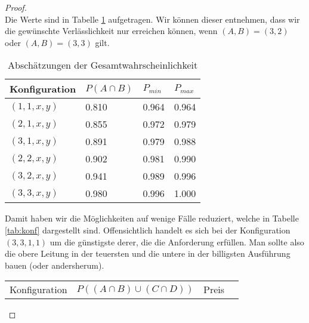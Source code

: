 \documentclass[a4paper]{scrartcl}
\begin{document}
\begin{enumerate}[label=\bfseries\arabic*.]
\begin{proof}
\begin{equation*}
                    \end{equation*}
                    Die Werte sind in Tabelle \ref{tab:absch} aufgetragen.
                    Wir können dieser entnehmen, dass wir die gewünschte
                    Verlässlichkeit nur erreichen können, wenn
                    $(A, B) = (3, 2)$ oder $(A, B) = (3, 3)$ gilt.
                    \begin{table}
                        \centering
                        \begin{tabular}{l|l|l|l}
                            Konfiguration & $P(A \cap B)$ & $P_{min}$ & $P_{max}$ \\
                            \hline
                            $(1, 1, x, y)$ & \num{0.810} & \num{0.964} & \num{0.964} \\
                            $(2, 1, x, y)$ & \num{0.855} & \num{0.972} & \num{0.979} \\
                            $(3, 1, x, y)$ & \num{0.891} & \num{0.979} & \num{0.988} \\
                            $(2, 2, x, y)$ & \num{0.902} & \num{0.981} & \num{0.990} \\
                            $(3, 2, x, y)$ & \num{0.941} & \num{0.989} & \num{0.996} \\
                            $(3, 3, x, y)$ & \num{0.980} & \num{0.996} & \num{1.000} \\%
                        \end{tabular}
                        \caption{Abschätzungen der Gesamtwahrscheinlichkeit}
                        \label{tab:absch}
                    \end{table}
                    Damit haben wir die Möglichkeiten auf wenige Fälle
                    reduziert, welche in Tabelle \ref{tab:konf} dargestellt
                    sind.
                    Offensichtlich handelt es sich bei der Konfiguration
                    $(3, 3, 1, 1)$ um die günstigste derer, die die Anforderung
                    erfüllen.
                    Man sollte also die obere Leitung in der teuersten und die
                    untere in der billigsten Ausführung bauen
                    (oder andersherum).
                    \begin{table}
                        \centering
                        \begin{tabular}{l|l|l|l}
                            Konfiguration & $P((A \cap B) \cup (C \cap D))$ & Preis \\

\end{tabular}
\end{table}
\end{proof}
\end{enumerate}
\end{document}
